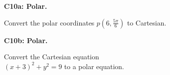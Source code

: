 \documentclass[12pt]{article}
\newcommand{\<}{\left\langle}
\renewcommand{\>}{\right\rangle}
\newcommand{\exerciseHeader}[4]{


  \vspace{0.5em}
  \textbf{#2}
  \vspace{0.5em}

}
\begin{document}
\begin{multicols}{2}
%

\exerciseHeader{2017 July 05}{C10a: Polar.}{
Convert and sketch polar and Cartesian coordinates and equations.
}{2/4}

Convert the polar coordinates \(p(6,\frac{5\pi}{6})\) to Cartesian.

\exerciseHeader{2017 July 05}{C10b: Polar.}{
Convert and sketch polar and Cartesian coordinates and equations.
}{2/4}

Convert the Cartesian equation \\ \((x+3)^2+y^2=9\) to a polar equation.




%

%

%

%


\end{multicols}
\end{document}
